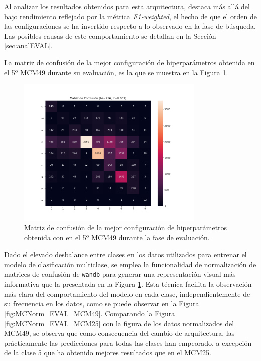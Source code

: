 Al analizar los resultados obtenidos para esta arquitectura, destaca más allá del bajo rendimiento reflejado por la métrica \textit{F1-weighted}, el hecho de que el orden de las configuraciones se ha invertido respecto a lo observado en la fase de búsqueda. Las posibles causas de este comportamiento se detallan en la Sección \ref{sec:analEVAL}.

La matriz de confusión de la mejor configuración de hiperparámetros obtenida en el 5º MCM49 durante su evaluación, es la que se muestra en la Figura \ref{fig:MC_EVAL_MCM49}.

\begin{figure}[H]
    \centering
    \includegraphics[width=0.8\textwidth]{./img/evaluacion/matrices_confusion/MC_EVAL_MCM49.png}
    \caption{Matriz de confusión de la mejor configuración de hiperparámetros obtenida con en el 5º MCM49 durante la fase de evaluación.}
    \label{fig:MC_EVAL_MCM49}
\end{figure}

Dado el elevado desbalance entre clases en los datos utilizados para entrenar el modelo de clasificación multiclase, se emplea la funcionalidad de normalización de matrices de confusión de \texttt{wandb} para generar una representación visual más informativa que la presentada en la Figura \ref{fig:MC_EVAL_MCM49}. Esta técnica facilita la observación más clara del comportamiento del modelo en cada clase, independientemente de su frecuencia en los datos, como se puede observar en la Figura \ref{fig:MCNorm_EVAL_MCM49}. Comparando la Figura \ref{fig:MCNorm_EVAL_MCM25} con la figura de los datos normalizados del MCM49, se observa que como consecuencia del cambio de arquitectura, las prácticamente las predicciones para todas las clases han empeorado, a excepción de la clase 5 que ha obtenido mejores resultados que en el MCM25.

